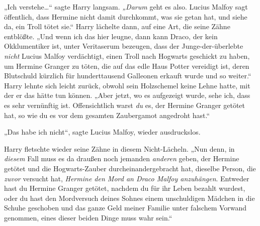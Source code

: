 „Ich verstehe…“ sagte Harry langsam. \emph{„Darum} geht es also. Lucius Malfoy sagt öffentlich, dass Hermine nicht damit durchkommt, was sie getan hat, und siehe da, ein Troll tötet sie.“ Harry lächelte dann, auf eine Art, die seine Zähne entblößte. „Und wenn ich das hier leugne, dann kann Draco, der kein Okklumentiker ist, unter Veritaserum bezeugen, dass der Junge-der-überlebte \emph{nicht} Lucius Malfoy verdächtigt, einen Troll nach Hogwarts geschickt zu haben, um Hermine Granger zu töten, die auf das edle Haus Potter vereidigt ist, deren Blutschuld kürzlich für hunderttausend Galleonen erkauft wurde und so weiter.“
Harry lehnte sich leicht zurück, obwohl sein Holzschemel keine Lehne hatte, mit der er das hätte tun können.
„Aber jetzt, wo es aufgezeigt wurde, sehe ich, dass es sehr vernünftig ist. Offensichtlich warst \emph{du} es, der Hermine Granger getötet hat, so wie du es vor dem gesamten Zaubergamot angedroht hast.“

„Das habe ich nicht“, sagte Lucius Malfoy, wieder ausdruckslos.

Harry fletschte wieder seine Zähne in diesem Nicht-Lächeln.
„Nun denn, in \emph{diesem} Fall muss es da draußen noch jemanden \emph{anderen} geben, der Hermine getötet und die Hogwarts-Zauber durcheinandergebracht hat, dieselbe Person, die \emph{zuvor} versucht hat, \emph{Hermine den Mord an Draco Malfoy anzuhängen}. Entweder hast du Hermine Granger getötet, nachdem du für ihr Leben bezahlt wurdest, oder du hast den Mordversuch deines Sohnes einem unschuldigen Mädchen in die Schuhe geschoben und das ganze Geld meiner Familie unter falschem Vorwand genommen, eines dieser beiden Dinge muss wahr sein.“


